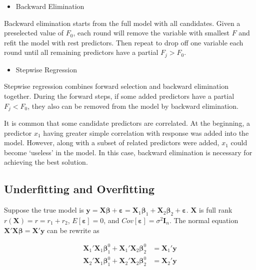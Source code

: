 \documentclass[
  11pt,
  openany]{memoir}
\providecommand{\tightlist}{%
  \setlength{\itemsep}{0pt}\setlength{\parskip}{0pt}}
\begin{document}
\begin{itemize}
\tightlist
\item
  Backward Elimination
\end{itemize}

Backward elimination starts from the full model with all candidates.
Given a preselected value of \(F_0\), each round will remove the variable with smallest \(F\) and refit the model with rest predictors.
Then repeat to drop off one variable each round until all remaining predictors have a partial \(F_j>F_0\).

\begin{itemize}
\tightlist
\item
  Stepwise Regression
\end{itemize}

Stepwise regression combines forward selection and backward elimination together. During the forward steps, if some added predictors have a partial \(F_j<F_0\), they also can be removed from the model by backward elimination.

It is common that some candidate predictors are correlated.
At the beginning, a predictor \(x_1\) having greater simple correlation with response was added into the model.
However, along with a subset of related predictors were added, \(x_1\) could become `useless' in the model. In this case, backward elimination is necessary for achieving the best solution.

\hypertarget{underfitting-and-overfitting}{%
\subsection{Underfitting and Overfitting}\label{underfitting-and-overfitting}}

Suppose the true model is \(\mathbf{y}=\mathbf{X}\boldsymbol\beta +\boldsymbol\varepsilon=\mathbf{X}_1\boldsymbol\beta_1 + \mathbf{X}_2\boldsymbol\beta_2 + \boldsymbol\varepsilon\). \(\mathbf{X}\) is full rank \(r(\mathbf{X})=r =r_1+r_2\), \(E[\boldsymbol\varepsilon]=0\), and \(Cov[\boldsymbol\varepsilon]= \sigma^2\mathbf{I}_n\).
The normal equation \(\mathbf{X'X}\boldsymbol\beta=\mathbf{X'y}\) can be rewrite as

\begin{equation}
\begin{split}
\mathbf{X}_1'\mathbf{X}_1\boldsymbol\beta^0_1+\mathbf{X}_1'\mathbf{X}_2\boldsymbol\beta^0_2&=\mathbf{X}_1'\mathbf{y}\\
\mathbf{X}_2'\mathbf{X}_1\boldsymbol\beta^0_1+\mathbf{X}_2'\mathbf{X}_2\boldsymbol\beta^0_2&=\mathbf{X}_2'\mathbf{y}\\
\end{split}
\end{equation}
\end{document}
